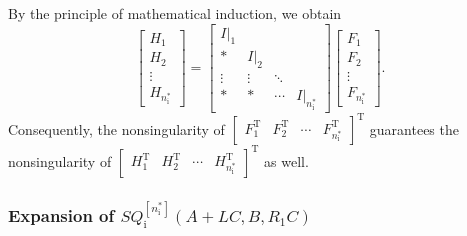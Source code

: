 \documentclass[sort&compress]{elsarticle}
\newcommand\nsharp{n_\mathrm i^*}
\newcommand\Qi{Q_\mathrm i}
\newcommand\T{\mathrm T}
\begin{document}
By the principle of mathematical induction, we obtain
\[
\begin{bmatrix}H_1\\ H_2\\ \vdots\\ H_{\nsharp}\end{bmatrix}
=\begin{bmatrix}
I|_1&&&\\
*&I|_2&\\
\vdots&\vdots&\ddots&\\
*&*&\cdots&I|_{\nsharp}
\end{bmatrix}
\begin{bmatrix}F_1\\ F_2\\ \vdots\\ F_{\nsharp}\end{bmatrix}.
\]
Consequently, the nonsingularity of
$\begin{bmatrix}F_1^\T & F_2^\T & \cdots & F_{\nsharp}^\T\end{bmatrix}^\T$
guarantees the nonsingularity of
$\begin{bmatrix}H_1^\T & H_2^\T & \cdots & H_{\nsharp}^\T\end{bmatrix}^\T$
as well.

\subsubsection{Expansion of $S \Qi^{[\nsharp]}(A+LC, B, R_1C)$}
\end{document}
